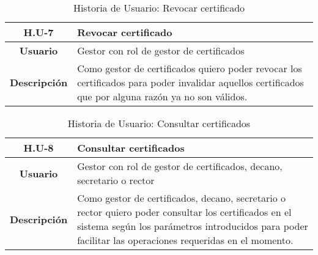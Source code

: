 \begin{table}[!h]
	\begin{center}
		\begin{tabular}{|c|p{10cm}|}
			\hline \textbf{H.U-7} & Revocar certificado \\ 
			\hline \textbf{Usuario} & Gestor con rol de gestor de certificados \\ 
			\hline \textbf{Descripci\'on} & Como gestor de certificados quiero poder revocar los certificados para poder invalidar aquellos certificados que por alguna raz\'on ya no son v\'alidos. \\ 
			\hline 
		\end{tabular}
		\caption{Historia de Usuario: Revocar certificado}
		\label{tab:HU7}
	\end{center}
\end{table}

\begin{table}[!h]
	\begin{center}
		\begin{tabular}{|c|p{10cm}|}
			\hline \textbf{H.U-8} & Consultar certificados \\ 
			\hline \textbf{Usuario} & Gestor con rol de gestor de certificados, decano, secretario o rector \\ 
			\hline \textbf{Descripci\'on} & Como gestor de certificados, decano, secretario o rector quiero poder consultar los certificados en el sistema seg\'un los par\'ametros introducidos para poder facilitar las operaciones requeridas en el momento. \\ 
			\hline 
		\end{tabular}
		\caption{Historia de Usuario: Consultar certificados}
		\label{tab:HU8}
	\end{center}
\end{table}